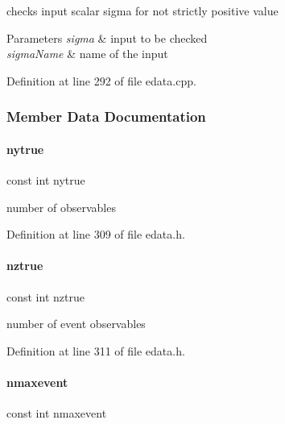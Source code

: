 checks input scalar sigma for not strictly positive value


\begin{DoxyParams}{Parameters}
{\em sigma} & input to be checked \\
\hline
{\em sigma\+Name} & name of the input \\
\hline
\end{DoxyParams}


Definition at line 292 of file edata.\+cpp.



\subsubsection{Member Data Documentation}
\mbox{\label{classamici_1_1_exp_data_a54bcfe56ad0df183516d096adf4e0b26}} 
\paragraph{\texorpdfstring{nytrue}{nytrue}}
{\footnotesize\ttfamily const int nytrue}

number of observables 

Definition at line 309 of file edata.\+h.

\mbox{\label{classamici_1_1_exp_data_a9a451378ba5572ef7a3fd4dd89e1c227}} 
\paragraph{\texorpdfstring{nztrue}{nztrue}}
{\footnotesize\ttfamily const int nztrue}

number of event observables 

Definition at line 311 of file edata.\+h.

\mbox{\label{classamici_1_1_exp_data_a48832d4f3a37c4fd75cc7f4ef578d1b1}} 
\paragraph{\texorpdfstring{nmaxevent}{nmaxevent}}
{\footnotesize\ttfamily const int nmaxevent}

